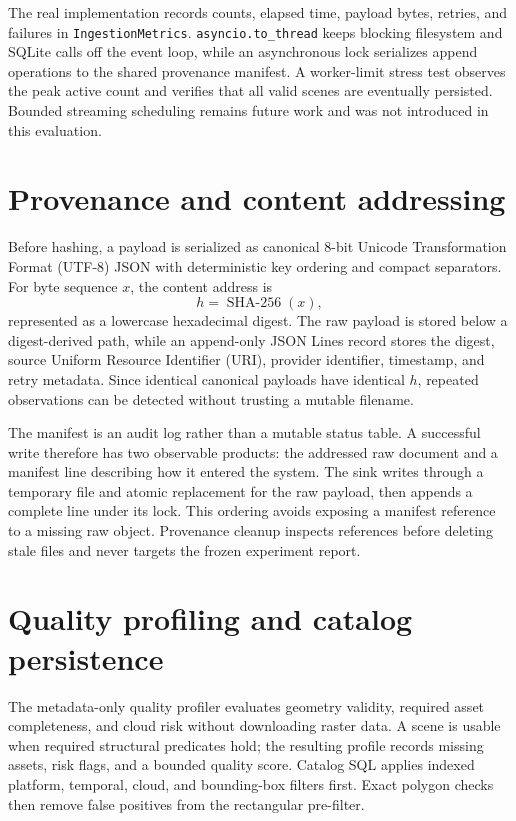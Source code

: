The real implementation records counts, elapsed time, payload bytes, retries, and failures in
\texttt{IngestionMetrics}. \texttt{asyncio.to\_thread} keeps blocking filesystem and SQLite calls
off the event loop, while an asynchronous lock serializes append operations to the shared
provenance manifest. A worker-limit stress test observes the peak active count and verifies that
all valid scenes are eventually persisted. Bounded streaming scheduling remains future work
and was not introduced in this evaluation.

\section{Provenance and content addressing}

Before hashing, a payload is serialized as canonical 8-bit Unicode Transformation Format
(UTF-8) JSON with deterministic key ordering and
compact separators. For byte sequence \(x\), the content address is
\[
h=\operatorname{SHA-256}(x),
\]
represented as a lowercase hexadecimal digest. The raw payload is stored below a digest-derived
path, while an append-only JSON Lines record stores the digest, source Uniform Resource
Identifier (URI), provider identifier,
timestamp, and retry metadata. Since identical canonical payloads have identical \(h\), repeated
observations can be detected without trusting a mutable filename.

The manifest is an audit log rather than a mutable status table. A successful write therefore has
two observable products: the addressed raw document and a manifest line describing how it entered
the system. The sink writes through a temporary file and atomic replacement for the raw payload,
then appends a complete line under its lock. This ordering avoids exposing a manifest reference to
a missing raw object. Provenance cleanup inspects references before deleting stale files and never
targets the frozen experiment report.

\section{Quality profiling and catalog persistence}

The metadata-only quality profiler evaluates geometry validity, required asset completeness, and
cloud risk without downloading raster data. A scene is usable when required structural predicates
hold; the resulting profile records missing assets, risk flags, and a bounded quality score.
Catalog SQL applies indexed platform, temporal, cloud, and bounding-box filters first. Exact
polygon checks then remove false positives from the rectangular pre-filter.

